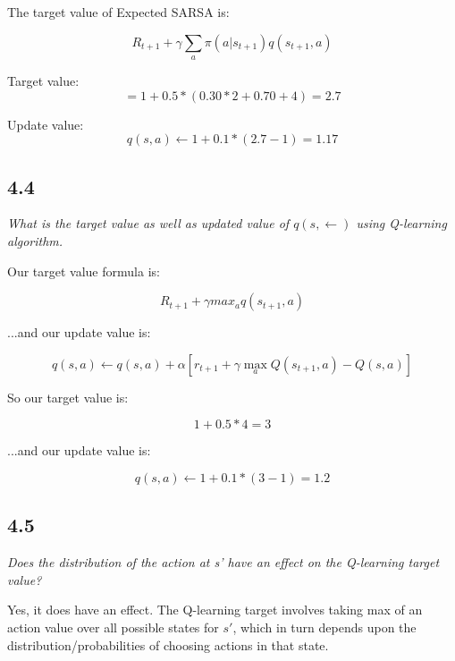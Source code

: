 \documentclass{article}
\begin{document}
The target value of Expected SARSA is:

\begin{equation}
    R_{t+1} + \gamma \sum_a \pi (a|s_{t+1})q(s_{t+1}, a)
\end{equation}

Target value:
\begin{equation}
    = 1 + 0.5 * ( 0.30 * 2 + 0.70 + 4 ) = 2.7
\end{equation}

Update value:
\begin{equation}
    q(s,a) \leftarrow 1 + 0.1 * (2.7 - 1) = 1.17
\end{equation}

\subsection*{4.4}

\textit{What is the target value as well as updated value of $q(s,\leftarrow)$ using Q-learning algorithm.}

Our target value formula is:

\begin{equation}
    R_{t+1} + \gamma max_a q(s_{t+1}, a)
\end{equation}

...and our update value is:

\begin{equation}
    q(s, a) \leftarrow q(s, a) + \alpha \left[r_{t+1} + \gamma \max_{a} Q(s_{t+1}, a) - Q(s, a)\right]
\end{equation}

So our target value is:

\begin{equation}
    1 + 0.5 * 4 = 3
\end{equation}

...and our update value is:

\begin{equation}
    q(s,a) \leftarrow 1 + 0.1 * (3 - 1) = 1.2
\end{equation}

\subsection*{4.5}

\textit{Does the distribution of the action at s' have an effect on the Q-learning target value?}

Yes, it does have an effect. The Q-learning target involves taking max of an action value over all possible states for $s'$, which in turn depends upon the distribution/probabilities of choosing actions in that state.
\end{document}
